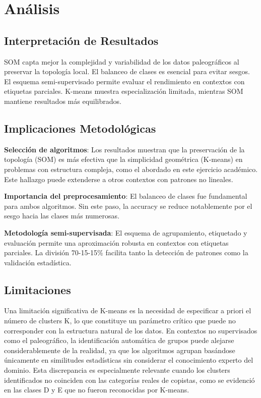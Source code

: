 \documentclass[12pt,a4paper]{article}
\begin{document}
\section{Análisis}

\subsection{Interpretación de Resultados}

SOM capta mejor la complejidad y variabilidad de los datos paleográficos al preservar la topología local. El balanceo de clases es esencial para evitar sesgos. El esquema semi-supervisado permite evaluar el rendimiento en contextos con etiquetas parciales. K-means muestra especialización limitada, mientras SOM mantiene resultados más equilibrados.

\subsection{Implicaciones Metodológicas}

\textbf{Selección de algoritmos}: Los resultados muestran que la preservación de la topología (SOM) es más efectiva que la simplicidad geométrica (K-means) en problemas con estructura compleja, como el abordado en este ejercicio académico. Este hallazgo puede extenderse a otros contextos con patrones no lineales.

\textbf{Importancia del preprocesamiento}: El balanceo de clases fue fundamental para ambos algoritmos. Sin este paso, la accuracy se reduce notablemente por el sesgo hacia las clases más numerosas.

\textbf{Metodología semi-supervisada}: El esquema de agrupamiento, etiquetado y evaluación permite una aproximación robusta en contextos con etiquetas parciales. La división 70-15-15\% facilita tanto la detección de patrones como la validación estadística.

\subsection{Limitaciones}

Una limitación significativa de K-means es la necesidad de especificar a priori el número de clusters K, lo que constituye un parámetro crítico que puede no corresponder con la estructura natural de los datos. En contextos no supervisados como el paleográfico, la identificación automática de grupos puede alejarse considerablemente de la realidad, ya que los algoritmos agrupan basándose únicamente en similitudes estadísticas sin considerar el conocimiento experto del dominio. Esta discrepancia es especialmente relevante cuando los clusters identificados no coinciden con las categorías reales de copistas, como se evidenció en las clases D y E que no fueron reconocidas por K-means.
\end{document}
